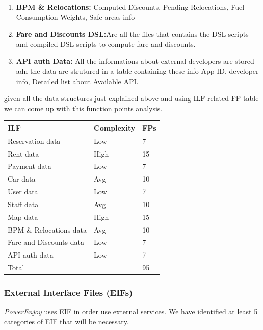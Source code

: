 \documentclass[english]{article}
\newenvironment{fpcounttable}[1]{
	\begin{center}
	\begin{longtable}{|l|l|l|}
	\hline 
	#1 & Complexity & FPs \\\hline
}{
	\end{longtable}\end{center}
}
\newcommand{\fptotal}[1]{
	\multicolumn{2}{|l|}{{Total}}
	& #1\\\hline
}
\newcommand{\powerenjoy}{\textit{PowerEnjoy }}
\newcommand{\ilh}{ & High & 15}
\newcommand{\ila}{ & Avg & 10}
\newcommand{\ill}{ & Low & 7}
\begin{document}
\begin {enumerate}
\begin{figure}[H]
				\caption{Map data Structure}
				\label{fig:mapStruct}
			\end{figure}
	\item  \textbf{BPM \& Relocations:} Computed Discounts, Pending Relocations, Fuel Consumption Weights, Safe areas info 
	\item  \textbf{Fare and Discounts DSL:}Are all the files that contains the DSL scripts and compiled DSL scripts to compute fare and discounts.
	\item  \textbf{API auth Data:} All the informations about external developers are stored adn the data are strutured in a table containing these info App ID, developer info,  Detailed list about Available API.
\end {enumerate}
given all the data structures just explained above and using ILF related FP table we can come up with this function points analysis.
\begin{fpcounttable}{ILF}
Reservation data\ill\\
Rent data\ilh \\
Payment data\ill\\
Car data\ila \\
User data \ill\\
Staff data\ila \\
Map data\ilh \\
BPM \& Relocations data\ila\\
Fare and Discounts data \ill\\
API auth data\ill\\\hline
\fptotal{95}	
\end{fpcounttable}

\subsubsection{External Interface Files (EIFs)}
\powerenjoy uses EIF in order use external services.
We have identified at least 5 categories of EIF that will be necessary.
\end{document}
